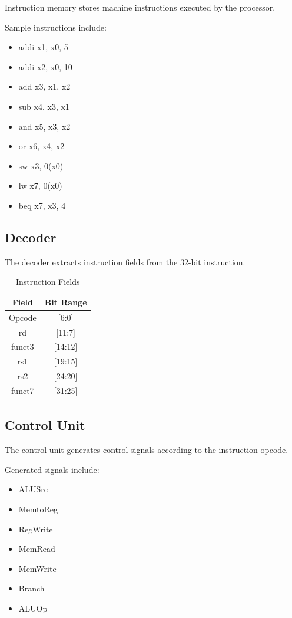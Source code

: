 \documentclass[conference]{IEEEtran}
\begin{document}
Instruction memory stores machine instructions executed by the processor.

Sample instructions include:

\begin{itemize}
    \item addi x1, x0, 5
    \item addi x2, x0, 10
    \item add x3, x1, x2
    \item sub x4, x3, x1
    \item and x5, x3, x2
    \item or x6, x4, x2
    \item sw x3, 0(x0)
    \item lw x7, 0(x0)
    \item beq x7, x3, 4
\end{itemize}


\subsection{Decoder}

The decoder extracts instruction fields from the 32-bit instruction.

\begin{table}[H]
\caption{Instruction Fields}
\centering
\begin{tabular}{|c|c|}
\hline
Field & Bit Range \\
\hline
Opcode & [6:0] \\
rd & [11:7] \\
funct3 & [14:12] \\
rs1 & [19:15] \\
rs2 & [24:20] \\
funct7 & [31:25] \\
\hline
\end{tabular}
\end{table}


\subsection{Control Unit}

The control unit generates control signals according to the instruction opcode.

Generated signals include:

\begin{itemize}
    \item ALUSrc
    \item MemtoReg
    \item RegWrite
    \item MemRead
    \item MemWrite
    \item Branch
    \item ALUOp
\end{itemize}
\end{document}
